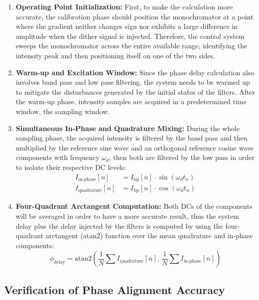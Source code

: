 \begin{enumerate}
    \item \textbf{Operating Point Initialization:} First, to make the calculation more accurate, the calibration phase should position the monochromator at a point where the gradient neither changes sign nor exhibits a large difference in amplitude when the dither signal is injected. Therefore, the control system sweeps the monochromator across the entire available range, identifying the intensity peak and then positioning itself on one of the two sides.
    \item \textbf{Warm-up and Excitation Window:} Since the phase delay calculation also involves band pass and low pass filtering, the system needs to be warmed up to mitigate the disturbances generated by the initial states of the filters. After the warm-up phase, intensity samples are acquired in a predetermined time window, the sampling window.
    \item \textbf{Simultaneous In-Phase and Quadrature Mixing:} 
    During the whole sampling phase, the acquired intensity is filtered by the band pass and then multiplied by the reference sine wave and an orthogonal reference cosine wave components with frequency $\omega_d$, then both are filtered by the low pass in order to isolate their respective DC levels:
    \begin{align}
        I_{\text{in-phase}}[n] &= I_{\text{bp}}[n] \cdot \sin(\omega_d t_n) \\
        I_{\text{quadrature}}[n] &= I_{\text{bp}}[n] \cdot \cos(\omega_d t_n)
    \end{align}
    \item \textbf{Four-Quadrant Arctangent Computation:} 
    Both DCs of the components will be averaged in order to have a more accurate result, thus the system delay plus the delay injected by the filters is computed by using the four-quadrant arctangent ($\text{atan2}$) function over the mean quadrature and in-phase components:
    \begin{equation}
        \phi_{\text{delay}} = \text{atan2}\left( \frac{1}{N}\sum I_{\text{quadrature}}[n], \, \frac{1}{N}\sum I_{\text{in-phase}}[n] \right)
    \end{equation}
\end{enumerate}

\subsection{Verification of Phase Alignment Accuracy}

